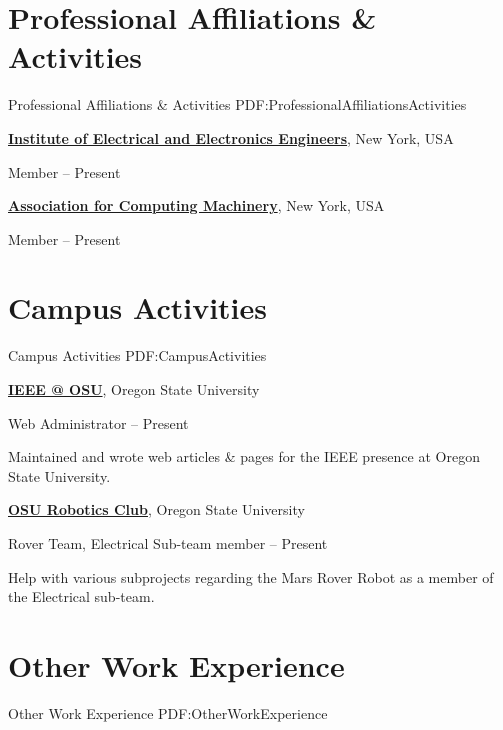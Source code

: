 \documentclass[letterpaper,MMMyyyy,nonstop]{simpleresumecv}
\begin{document}
\begin{body}

\section
{Professional Affiliations\newline
\& Activities}
{Professional Affiliations \& Activities}
{PDF:ProfessionalAffiliationsActivities}

\href{http://www.ieee.org}
{\textbf{Institute of Electrical and Electronics Engineers}},
New York, USA

\GapNoBreak
\BulletItem
Member
\hfill
{} --
Present

\href{http://www.ieee.org}
{\textbf{Association for Computing Machinery}},
New York, USA

\GapNoBreak
\BulletItem
Member
\hfill
{} --
Present


\section
{Campus Activities}
{Campus Activities}
{PDF:CampusActivities}

\href{http://groups.engr.oregonstate.edu/ieee-new}
{\textbf{IEEE @ OSU}},
Oregon State University

\GapNoBreak
\BulletItem
Web Administrator
\hfill
{} --
Present
\begin{detail}
\SubBulletItem
Maintained and wrote web articles \& pages for the IEEE presence at Oregon State University.
\end{detail}

\href{http://osurobotics.club}
{\textbf{OSU Robotics Club}},
Oregon State University

\GapNoBreak
\BulletItem
Rover Team, Electrical Sub-team member
\hfill
{} --
Present
\begin{detail}
\SubBulletItem
Help with various subprojects regarding the Mars Rover Robot as a member of the Electrical sub-team.
\end{detail}


\section
{Other Work\newline
Experience}
{Other Work Experience}
{PDF:OtherWorkExperience}


\end{body}
\end{document}
